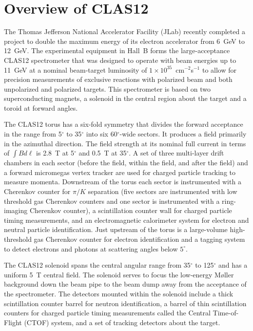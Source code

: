 \documentclass{elsart}
\begin{document}
\newpage
\tableofcontents

\newpage
\section{Overview of CLAS12}

The Thomas Jefferson National Accelerator Facility (JLab) recently completed a project to 
double the maximum energy of its electron accelerator from 6~GeV to 12~GeV. The experimental 
equipment in Hall~B forms the large-acceptance CLAS12 spectrometer that was designed to operate 
with beam energies up to 11~GeV at a nominal beam-target luminosity of 
$1 \times 10^{35}$~cm$^{-2}$s$^{-1}$ to allow for precision measurements of exclusive 
reactions with polarized beam and both unpolarized and polarized targets. This spectrometer is 
based on two superconducting magnets, a solenoid in the central region about the target and a 
toroid at forward angles.

The CLAS12 torus has a six-fold symmetry that divides the forward acceptance in the range from
5$^\circ$ to 35$^\circ$ into six 60$^\circ$-wide sectors. It produces a field primarily in the 
azimuthal direction. The field strength at its nominal full current in terms of 
$\int \!B d\ell$ is 2.8~T at 5$^\circ$ and 0.5~T at 35$^\circ$. A set of three multi-layer drift 
chambers in each sector (before the field, within the field, and after the field) and a forward
micromegas vertex tracker are used for charged particle tracking to measure momenta. Downstream 
of the torus each sector is instrumented with a Cherenkov counter for $\pi/K$ separation (five 
sectors are instrumented with low threshold gas Cherenkov counters and one sector is instrumented 
with a ring-imaging Cherenkov counter), a scintillation counter wall for charged particle 
timing measurements, and an electromagnetic calorimeter system for electron and neutral particle 
identification. Just upstream of the torus is a large-volume high-threshold gas Cherenkov counter 
for electron identification and a tagging system to detect electrons and photons at scattering 
angles below $5^\circ$.

The CLAS12 solenoid spans the central angular range from 35$^\circ$ to 125$^\circ$ and has a 
uniform 5~T central field. The solenoid serves to focus the low-energy M{\o}ller background down 
the beam pipe to the beam dump away from the acceptance of the spectrometer. The detectors
mounted within the solenoid include a thick scintillation counter barrel for neutron identification, a
barrel of thin scintillation counters for charged particle timing measurements called the Central 
Time-of-Flight (CTOF) system, and a set of tracking detectors about the target.
\end{document}
